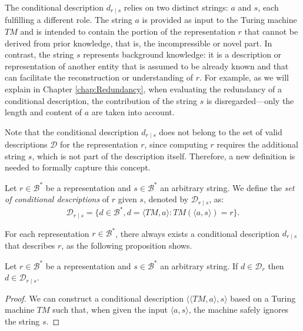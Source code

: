 The conditional description $d_{r \mid s}$ relies on two distinct strings: $a$ and $s$, each fulfilling a different role. The string $a$ is provided as input to the Turing machine $TM$ and is intended to contain the portion of the representation $r$ that cannot be derived from prior knowledge, that is, the incompressible or novel part. In contrast, the string $s$ represents background knowledge: it is a description or representation of another entity that is assumed to be already known and that can facilitate the reconstruction or understanding of $r$. For example, as we will explain in Chapter \ref{chap:Redundancy}, when evaluating the redundancy of a conditional description, the contribution of the string $s$ is disregarded—only the length and content of $a$ are taken into account.

Note that the conditional description $d_{r \mid s}$ does not belong to the set of valid descriptions $\mathcal{D}$ for the representation $r$, since computing $r$ requires the additional string $s$, which is not part of the description itself. Therefore, a new definition is needed to formally capture this concept.

\begin{definition}
Let $r \in \mathcal{B}^\ast$ be a representation and $s \in \mathcal{B}^\ast$ an arbitrary string. We define the \emph{set of conditional descriptions} of $r$ given $s$, denoted by $\mathcal{D}_{r \mid s}$, as:
\[
\mathcal{D}_{r \mid s} = \{ d \in \mathcal{B}^\ast, d = \langle TM, a \rangle : TM \left(\langle a, s \rangle \right) = r \}.
\]
\end{definition}

For each representation $r \in \mathcal{B}^\ast$, there always exists a conditional description $d_{r \mid s}$ that describes $r$, as the following proposition shows.

\begin{proposition}
\label{prop:description_implies_conditional}
Let $r \in \mathcal{B}^\ast$ be a representation and $s \in \mathcal{B}^\ast$ an arbitrary string. If $d \in \mathcal{D}_{r}$ then $d \in \mathcal{D}_{r \mid s}$.
\end{proposition}
\begin{proof}
We can construct a conditional description $\langle \langle TM, a \rangle, s \rangle$ based on a Turing machine $TM$ such that, when given the input $\langle a, s \rangle$, the machine safely ignores the string $s$.
\end{proof}

